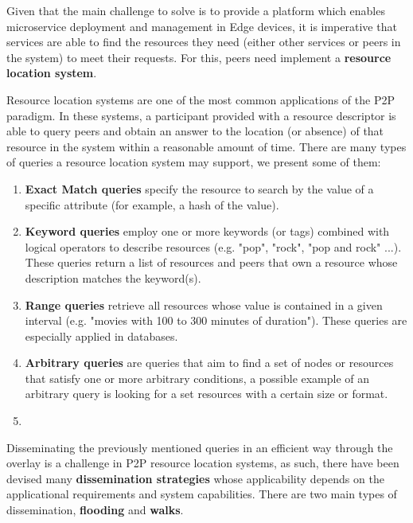 

Given that the main challenge to solve is to provide a platform which enables microservice deployment and management in Edge devices, it is imperative that services are able to find the resources they need (either other services or peers in the system) to meet their requests. For this, peers need implement a \textbf{resource location system}.

Resource location systems are one of the most common applications of the P2P paradigm. In these systems, a participant provided with a resource descriptor is able to query peers and obtain an answer to the location (or absence) of that resource in the system within a reasonable amount of time. There are many types of queries a resource location system may support, we present some of them:

\begin{enumerate}
    \item \textbf{Exact Match queries} specify the resource to search by the value of a specific attribute (for example, a hash of the value).

    \item \textbf{Keyword queries} employ one or more keywords (or tags) combined with logical operators to describe resources (e.g. "pop", "rock", "pop and rock" ...). These queries return a list of resources and peers that own a resource whose description matches the keyword(s).
    
    \item \textbf{Range queries} retrieve all resources whose value is contained in a given interval (e.g. "movies with 100 to 300 minutes of duration"). These queries are especially applied in databases.
    
    \item \textbf{Arbitrary queries} are queries that aim to find a set of nodes or resources that satisfy one or more arbitrary conditions, a possible example of an arbitrary query is looking for a set resources with a certain size or format.
    \item 
\end{enumerate}

Disseminating the previously mentioned queries in an efficient way through the overlay is a challenge in P2P resource location systems, as such, there have been devised many \textbf{dissemination strategies} whose applicability depends on the applicational requirements and system capabilities. There are two main types of dissemination, \textbf{flooding} and \textbf{walks}.

